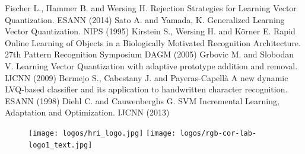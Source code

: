\documentclass{article}
\begin{document}
\begin{multicols}{3}
\begin{thebibliography}{}

 Fischer L., Hammer B. and Wersing H. Rejection Strategies for Learning Vector Quantization. ESANN (2014)
Sato A. and Yamada, K. Generalized Learning Vector Quantization. NIPS (1995) 
Kirstein S., Wersing H. and K{\"o}rner E. Rapid Online Learning of Objects in a Biologically Motivated Recognition Architecture. 27th Pattern Recognition Symposium DAGM (2005)
Grbovic M. and Slobodan V. Learning Vector Quantization with adaptive prototype addition and removal. IJCNN (2009)
Bermejo S., Cabestany J. and Payeras{-}Capell{\`{a}} A new dynamic LVQ-based classifier and its application to handwritten character recognition. ESANN (1998)
Diehl C. and Cauwenberghs G. SVM Incremental Learning, Adaptation and Optimization. IJCNN (2013)
\end{thebibliography}

\begin{figure}[H]
\begin{center}
\texttt{[image: logos/hri\_logo.jpg]}
\hspace{220 pt}
\texttt{[image: logos/rgb-cor-lab-logo1\_text.jpg]}
\end{center}
\end{figure}


\end{multicols}
\end{document}
